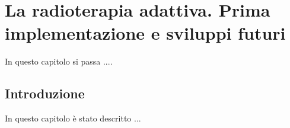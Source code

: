 \chapter{La radioterapia adattiva. Prima implementazione e sviluppi futuri}
\minitoc
\textsf{In questo capitolo si passa ....}



\section{Introduzione}
In questo capitolo è stato descritto ... 












